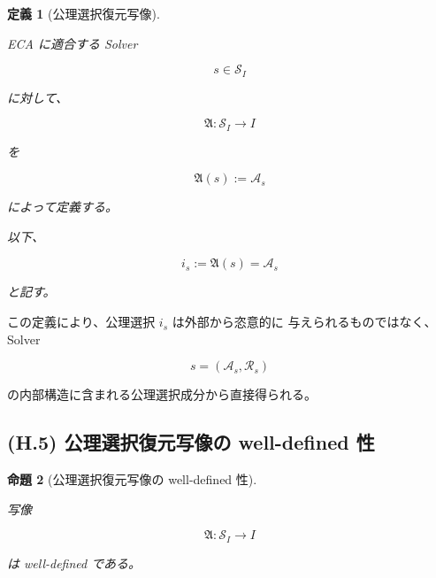 \documentclass[a4paper,11pt]{article}
\newtheorem{definition}{定義}[section]
\newtheorem{proposition}[definition]{命題}
\begin{document}
\begin{definition}[公理選択復元写像]
\label{def:H-axiom-map}

ECA に適合する Solver

\begin{equation}
    s\in\mathcal{S}_I
\end{equation}

に対して、

\begin{equation}
    \mathfrak{A}:
    \mathcal{S}_I
    \longrightarrow
    I
\end{equation}

を

\begin{equation}
    \boxed{
        \mathfrak{A}(s)
        :=
        \mathcal{A}_s
    }
    \label{eq:H-axiom-reconstruction}
\end{equation}

によって定義する。

以下、

\begin{equation}
    \boxed{
        i_s
        :=
        \mathfrak{A}(s)
        =
        \mathcal{A}_s
    }
    \label{eq:H-is}
\end{equation}

と記す。
\end{definition}

この定義により、公理選択 $i_s$ は外部から恣意的に
与えられるものではなく、Solver

\begin{equation}
    s=(\mathcal{A}_s,\mathcal{R}_s)
\end{equation}

の内部構造に含まれる公理選択成分から直接得られる。


\subsection{(H.5) 公理選択復元写像の well-defined 性}
\label{subsec:H5}

\begin{proposition}[公理選択復元写像の well-defined 性]
\label{prop:H-axiom-well-defined}

写像

\begin{equation}
    \mathfrak{A}:
    \mathcal{S}_I
    \longrightarrow
    I
\end{equation}

は well-defined である。
\end{proposition}
\end{document}
